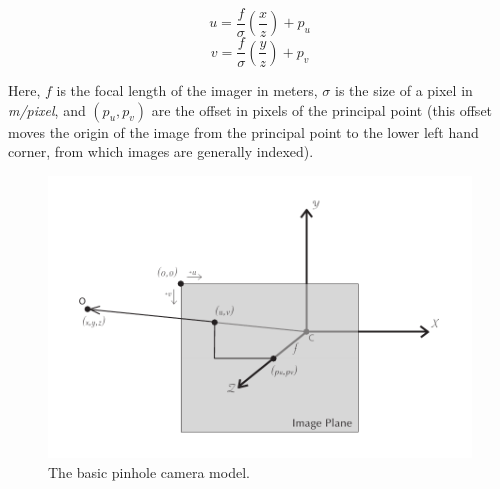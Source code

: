 $$u = \frac{f}{\sigma} \left(\frac{x}{z}\right) + p_u$$
$$v = \frac{f}{\sigma} \left(\frac{y}{z}\right) + p_v$$

Here, $f$ is the focal length of the imager in meters, $\sigma$ is the size of a pixel in {\em m/pixel}, and $(p_u, p_v)$ are the offset in pixels of the principal point (this offset moves the origin of the image from the principal point to the lower left hand corner, from which images are generally indexed).

\begin{figure}[tbp]
\begin{center}
  \includegraphics[width=5in]{images/camera_module_pinhole.pdf}
 \end{center}
  \label{fig:camera_module_pinhole}
  \caption{The basic pinhole camera model.}
\end{figure}

